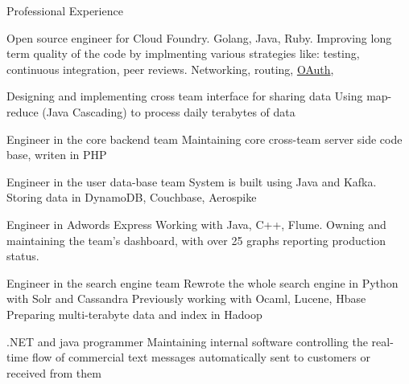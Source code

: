 \begin{rubric}{\color{ForestGreen} Professional Experience}

   Open source engineer
  for Cloud Foundry. Golang, Java, Ruby.
  Improving long term quality of the code by implmenting various
  strategies like:
   testing, continuous integration, peer reviews.
  \entry* Networking, routing, \href{https://en.wikipedia.org/wiki/OAuth}{OAuth},

   Designing and implementing cross team interface for sharing data
  Using map-reduce (Java Cascading) to process daily terabytes of data

   Engineer in the core backend team
  Maintaining core cross-team server side code base, writen in PHP

   Engineer in the user data-base team
  System is built using Java and Kafka. Storing data in DynamoDB,
  Couchbase, Aerospike

  \entry*[\color{ForestGreen} {Feb 13 - Sep 14}]  Engineer in {Adwords Express}
  Working with Java, C++, Flume. Owning and maintaining the team's
  dashboard, with over 25 graphs reporting production status.


  Engineer in the {search engine team}
  Rewrote the whole search engine in Python with Solr and Cassandra
  Previously working with Ocaml, Lucene, Hbase
  Preparing multi-terabyte data and index in Hadoop


  .NET and java programmer
  Maintaining internal software controlling the real-time flow of
  commercial text messages automatically sent to customers or received
  from them

\end{rubric}
